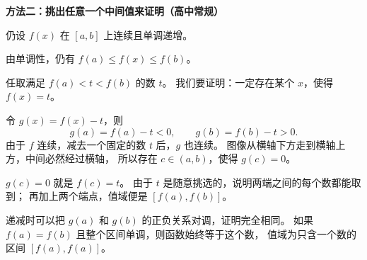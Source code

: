 \begin{proofbox}
\textbf{\textcolor{CProof}{方法二：挑出任意一个中间值来证明（高中常规）}}
\begin{center}\end{center}

    仍设 $f(x)$ 在 $[a,b]$ 上连续且单调递增。
    \begin{description}[style=nextline,leftmargin=2.8em,labelsep=0.5em,itemsep=0.48em]
        \item[\textbf{第一步：先确定不会超出端点。}]
            由单调性，仍有 $f(a)\le f(x)\le f(b)$。
        \item[\textbf{第二步：随意挑一个目标高度。}]
            任取满足 $f(a)<t<f(b)$ 的数 $t$。
            我们要证明：一定存在某个 $x$，使得 $f(x)=t$。
        \item[\textbf{第三步：把问题变成寻找零点。}]
            令 $g(x)=f(x)-t$，则
            \[
                g(a)=f(a)-t<0,\qquad g(b)=f(b)-t>0.
            \]
            由于 $f$ 连续，减去一个固定的数 $t$ 后，$g$ 也连续。
            图像从横轴下方走到横轴上方，中间必然经过横轴，
            所以存在 $c\in(a,b)$，使得 $g(c)=0$。
        \item[\textbf{第四步：还原成函数值。}]
            $g(c)=0$ 就是 $f(c)=t$。
            由于 $t$ 是随意挑选的，说明两端之间的每个数都能取到；
            再加上两个端点，值域便是 $[f(a),f(b)]$。
    \end{description}
    递减时可以把 $g(a)$ 和 $g(b)$ 的正负关系对调，证明完全相同。
    如果 $f(a)=f(b)$ 且整个区间单调，则函数始终等于这个数，
    值域为只含一个数的区间 $[f(a),f(a)]$。

    \medskip
    \end{proofbox}
\clearpage
